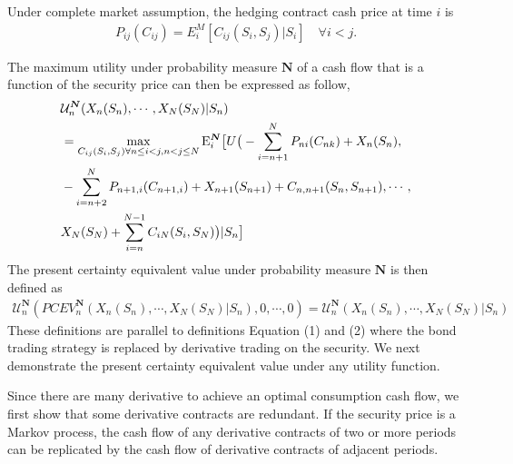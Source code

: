 {\proposition \label{prop:derPrice}
 Under complete market assumption, the hedging contract cash price at time $i$ is
\begin{align}
P_{ij}(C_{ij}) = E_i^M[C_{ij}(S_i,S_j)|S_i] \quad \forall i< j.
\end{align}
}

The maximum utility under probability measure $\bm{N}$ of a cash flow that is a function of the security price can then be expressed as follow,
\begin{align} \label{eqn:maxUtiFhMultiFlow}
&\mathcal{U}^{\bm{N}}_n (X_n(S_n),\cdots, X_N(S_N)|S_n) \\&= \max_{C_{ij}(S_i,S_j) \forall n\leq i <j, n< j \leq N} \mathrm{E}_i^{\bm{N}} \big{[}U\big{(}- \sum_{i=n+1}^N P_{ni} (C_{nk})+X_n(S_n), \nonumber \\ &-\sum_{i=n+2}^N P_{n+1,i} (C_{n+1,i})+X_{n+1}(S_{n+1}) + C_{n,n+1}(S_n,S_{n+1}), \cdots, \nonumber\\&
X_N(S_N) + \sum_{i=n}^{N-1} C_{iN}(S_i,S_N) \big{)}|S_n\big{]} \nonumber
\end{align}
The present certainty equivalent value under probability measure $\bm{N}$ is then  defined as
\begin{align}\label{eqn:pcevFhMultiFlow}
\mathcal{U}^{\bm{N}} _n(PCEV_n^{\bm{N}}(X_n(S_n),\cdots,X_N(S_N)|S_n), 0, \cdots, 0) = \mathcal{U}^{\bm{N}}_n (X_n(S_n),\cdots, X_N(S_N)|S_n) 
\end{align}
These definitions are parallel to definitions Equation (1) and (2) where the bond trading strategy is replaced by derivative trading on the security. We next demonstrate the present certainty equivalent value under any utility function.

Since there are many derivative to achieve an optimal consumption cash flow, we first 
show that some derivative contracts are redundant. 
{\lemma \label{lem:derRedundancy}
If the  security price is a Markov process, the cash flow of any derivative contracts of two or more periods can be replicated by the cash flow of derivative contracts of adjacent periods.}


